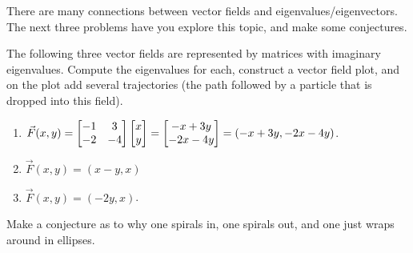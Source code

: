 \mysubsection{\ideaeig}
There are many connections between vector fields and eigenvalues/eigenvectors.  The next three problems have you explore this topic, and make some conjectures.  


\begin{problem}
The following three vector fields are represented by matrices with imaginary eigenvalues. Compute the eigenvalues for each, construct a vector field plot, and on the plot add several trajectories (the path followed by a particle that is dropped into this field). 
\begin{enumerate}
 \item $\vec F(x,y) = \begin{bmatrix} -1&3\\-2&-4 \end{bmatrix}\begin{bmatrix} x\\y \end{bmatrix}=\begin{bmatrix} -x+3y\\ -2x-4y \end{bmatrix}=(-x+3y, -2x-4y)$.
 \item $\vec F(x,y) = (x-y, x)$ 
 \item $\vec F(x,y) = (-2y,x)$. 
\end{enumerate}
Make a conjecture as to why one spirals in, one spirals out, and one just wraps around in ellipses. 
\end{problem}




